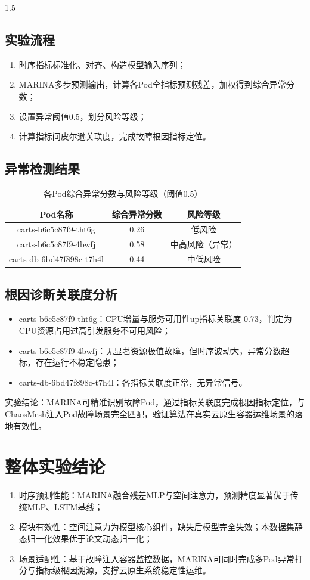 \documentclass[a4paper,12pt]{report}
\begin{document}
\begin{spacing}{1.5}
\subsection{实验流程}
\begin{enumerate}
    \item 时序指标标准化、对齐、构造模型输入序列；
    \item MARINA多步预测输出，计算各Pod全指标预测残差，加权得到综合异常分数；
    \item 设置异常阈值0.5，划分风险等级；
    \item 计算指标间皮尔逊关联度，完成故障根因指标定位。
\end{enumerate}

\subsection{异常检测结果}
\begin{table}[htbp]
\centering
\caption{各Pod综合异常分数与风险等级（阈值0.5）}
\begin{tabular}{ccc}
\toprule
\textbf{Pod名称} & \textbf{综合异常分数} & \textbf{风险等级} \\
\midrule
carts-b6c5c87f9-tht6g & 0.26 & 低风险 \\
carts-b6c5c87f9-4bwfj & 0.58 & 中高风险（异常） \\
carts-db-6bd47f898c-t7h4l & 0.44 & 中低风险 \\
\bottomrule
\end{tabular}
\end{table}

\subsection{根因诊断关联度分析}
\begin{itemize}
    \item carts-b6c5c87f9-tht6g：CPU增量与服务可用性up指标关联度-0.73，判定为CPU资源占用过高引发服务不可用风险；
    \item carts-b6c5c87f9-4bwfj：无显著资源极值故障，但时序波动大，异常分数超标，存在运行不稳定隐患；
    \item carts-db-6bd47f898c-t7h4l：各指标关联度正常，无异常信号。
\end{itemize}

实验结论：MARINA可精准识别故障Pod，通过指标关联度完成根因指标定位，与ChaosMesh注入Pod故障场景完全匹配，验证算法在真实云原生容器运维场景的落地有效性。

\section{整体实验结论}
\begin{enumerate}
    \item 时序预测性能：MARINA融合残差MLP与空间注意力，预测精度显著优于传统MLP、LSTM基线；
    \item 模块有效性：空间注意力为模型核心组件，缺失后模型完全失效；本数据集静态归一化效果优于论文动态归一化；
    \item 场景适配性：基于故障注入容器监控数据，MARINA可同时完成多Pod异常打分与指标级根因溯源，支撑云原生系统稳定性运维。
\end{enumerate}


\end{spacing}
\end{document}
